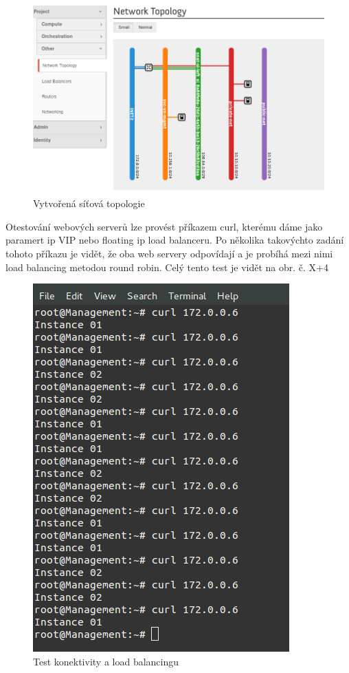 \begin{figure}[h]
\begin{centering}
\includegraphics[scale=0.45]{images/lbaas_topologie}
\par\end{centering}
\caption{Vytvořená síťová topologie\label{fig:lbaas_topologie}}
\end{figure}

Otestování webových serverů lze provést příkazem curl, kterému dáme jako paramert ip VIP nebo floating ip load balanceru. Po několika takovýchto zadání tohoto příkazu je vidět, že oba web servery odpovídají a je probíhá mezi nimi load balancing metodou round robin.  Celý tento test je vidět na obr. č. X+4

\begin{figure}[h]
\begin{centering}
\includegraphics[scale=0.45]{images/lbaas_testing}
\par\end{centering}
\caption{Test konektivity a load balancingu\label{fig:lbaas_testing}}
\end{figure}



